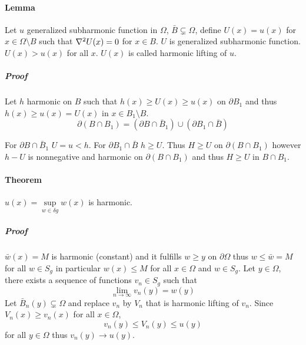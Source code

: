 \paragraph{Lemma} Let $u$ generalized subharmonic function in $\Omega$, $\bar{B} \subsetneq \Omega$, define 
$U(x) = 
u(x) $ for $x\in \Omega \setminus B$ such that $\laplacian{U(x)}=0$ for $x\in B$. $U$ is generalized subharmonic function. $U(x) > u(x)$ for all $x$. $U(x)$ is called harmonic lifting of $u$.

\subparagraph{Proof}
Let $h$ harmonic on $B$ such that $h(x) \geq U(x) \geq u(x)$ on $\partial B_1$ and thus $h(x) \geq u(x) = U(x)$ in $x \in B_1 \setminus B$.
$$\partial (B\cap B_1) = (\partial B \cap \bar{B}_1)\cup(\partial B_1 \cap \bar{B})$$

For  $\partial B \cap \bar{B}_1$ $U=u< h$.
For $\partial B_1 \cap \bar{B}$ $h\geq U$. 
Thus $H \geq U$ on $\partial (B\cap B_1)$ however $h-U$ is nonnegative and harmonic on $\partial (B\cap B_1)$  and thus $H \geq U$ in $B\cap B_1$.
\paragraph{Theorem}
$u(x) = \sup\limits_{w\in \delta g} w(x)$ is harmonic.
\subparagraph{Proof} $\bar{w}(x) = M$ is harmonic (constant) and it fulfills $w\geq y$ on $\partial \Omega$ thus $w\leq \bar{w} = M$ for all $w\in S_g$ in particular $w(x) \leq M$ for all $x\in \Omega$ and $w\in S_g$. Let $y\in \Omega$, there exists a sequence of functions $v_n \in S_g$ such that
$$\lim_{n \to \infty} v_n(y) = w(y)$$
Let $\bar{B}_n(y) \subsetneq \Omega$ and replace $v_n$ by $V_n$  that is harmonic lifting of $v_n$. Since $V_n(x) \geq v_n(x)$ for all $x\in \Omega$, 
$$v_n(y) \leq V_n(y) \leq u(y)$$
for all $y\in \Omega$ thus $v_n(y) \to u(y)$.